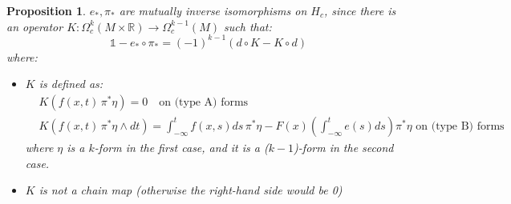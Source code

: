 \documentclass[a4paper,11pt,titlepage, article, oneside]{memoir}
\numberwithin{equation}{section}
\newtheorem{proposition}[theorem]{Proposition}
\theoremstyle{definition}
\theoremstyle{remark}
\newcommand{\rfield}{\mathbb{R}}
\begin{document}
\begin{proposition} \label{kprop}
$e_*, \pi_*$ are mutually inverse isomorphisms on $H_c$, since there is an operator $K \colon \Omega^k_c(M \times \rfield) \rightarrow \Omega_c^{k-1}(M)$ such that:
\begin{equation}
\mathbb{1} - e_* \circ \pi_* = (-1)^{k-1} (d \circ K - K \circ d)
\end{equation}
where:
\begin{itemize}
\item $K$ is defined as:
\begin{align}
&K(f(x, t)\, \pi^*\eta) = 0 \quad \text{on (type A) forms} \\
&K(f(x, t)\, \pi^* \eta \wedge dt) = \int_{-\infty}^t f(x, s) ds\, \pi^* \eta - F(x) \left ( \int_{-\infty}^t e(s)ds \right) \pi^* \eta \, \, \text{on (type B) forms}
\end{align}
where $\eta$ is a $k$-form in the first case, and it is a ($k-1$)-form in the second case.
\item $K$ is not a chain map (otherwise the right-hand side would be 0)
\end{itemize}
\end{proposition}
\end{document}
